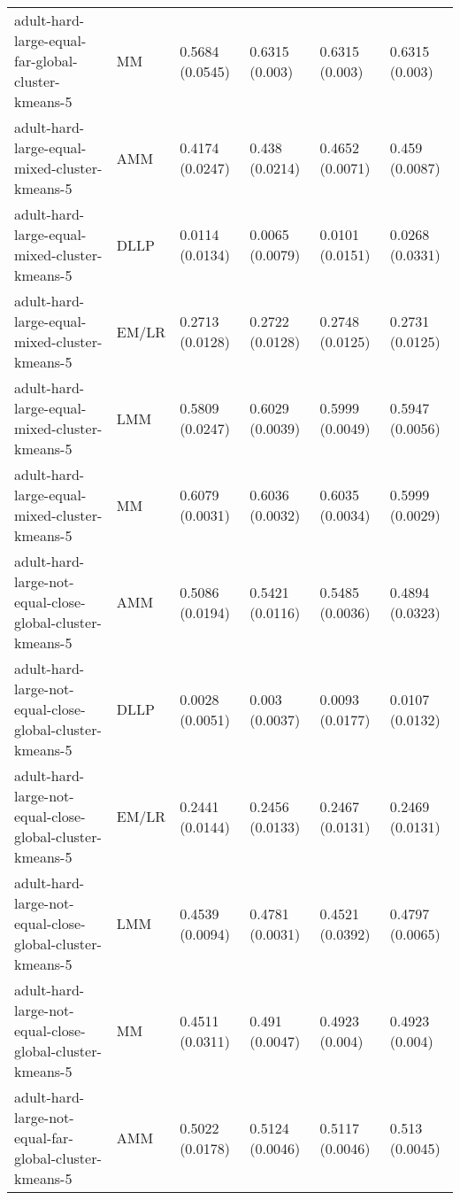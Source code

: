 \begin{longtable}{llllll}
                                     adult-hard-large-equal-far-global-cluster-kmeans-5 &        MM & 0.5684 (0.0545) &   0.6315 (0.003) &    0.6315 (0.003) &      0.6315 (0.003) \\
                                          adult-hard-large-equal-mixed-cluster-kmeans-5 &       AMM & 0.4174 (0.0247) &   0.438 (0.0214) &   0.4652 (0.0071) &      0.459 (0.0087) \\
                                          adult-hard-large-equal-mixed-cluster-kmeans-5 &      DLLP & 0.0114 (0.0134) &  0.0065 (0.0079) &   0.0101 (0.0151) &     0.0268 (0.0331) \\
                                          adult-hard-large-equal-mixed-cluster-kmeans-5 &     EM/LR & 0.2713 (0.0128) &  0.2722 (0.0128) &   0.2748 (0.0125) &     0.2731 (0.0125) \\
                                          adult-hard-large-equal-mixed-cluster-kmeans-5 &       LMM & 0.5809 (0.0247) &  0.6029 (0.0039) &   0.5999 (0.0049) &     0.5947 (0.0056) \\
                                          adult-hard-large-equal-mixed-cluster-kmeans-5 &        MM & 0.6079 (0.0031) &  0.6036 (0.0032) &   0.6035 (0.0034) &     0.5999 (0.0029) \\
                               adult-hard-large-not-equal-close-global-cluster-kmeans-5 &       AMM & 0.5086 (0.0194) &  0.5421 (0.0116) &   0.5485 (0.0036) &     0.4894 (0.0323) \\
                               adult-hard-large-not-equal-close-global-cluster-kmeans-5 &      DLLP & 0.0028 (0.0051) &   0.003 (0.0037) &   0.0093 (0.0177) &     0.0107 (0.0132) \\
                               adult-hard-large-not-equal-close-global-cluster-kmeans-5 &     EM/LR & 0.2441 (0.0144) &  0.2456 (0.0133) &   0.2467 (0.0131) &     0.2469 (0.0131) \\
                               adult-hard-large-not-equal-close-global-cluster-kmeans-5 &       LMM & 0.4539 (0.0094) &  0.4781 (0.0031) &   0.4521 (0.0392) &     0.4797 (0.0065) \\
                               adult-hard-large-not-equal-close-global-cluster-kmeans-5 &        MM & 0.4511 (0.0311) &   0.491 (0.0047) &    0.4923 (0.004) &      0.4923 (0.004) \\
                                 adult-hard-large-not-equal-far-global-cluster-kmeans-5 &       AMM & 0.5022 (0.0178) &  0.5124 (0.0046) &   0.5117 (0.0046) &      0.513 (0.0045) \\

\end{longtable}
